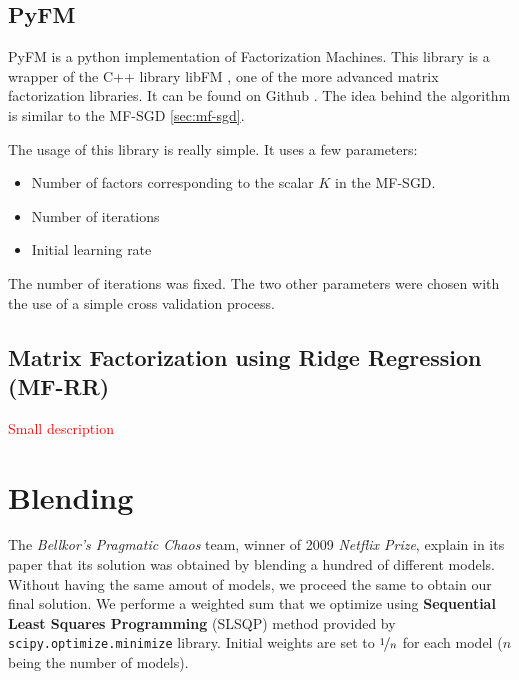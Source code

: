 \documentclass[10pt,conference,compsocconf]{IEEEtran}
\begin{document}
\subsection{PyFM}


PyFM is a python implementation of Factorization Machines. This library is a wrapper of the C++ library libFM \cite{rendle:tist2012}, one of the more advanced matrix factorization libraries. It can be found on Github \cite{pyfm}. The idea behind the algorithm is similar to the MF-SGD \ref{sec:mf-sgd}. 

The usage of this library is really simple. It uses a few parameters:
\begin{itemize}
 \item Number of factors corresponding to the scalar $K$ in the MF-SGD.
 \item Number of iterations
 \item Initial learning rate
\end{itemize}

The number of iterations was fixed. The two other parameters were chosen with the use of a simple cross validation process.

\subsection{Matrix Factorization using Ridge Regression (MF-RR)}

\textcolor{red}{Small description}

\section{Blending}

The \textit{Bellkor's Pragmatic Chaos} team, winner of 2009 \textit{Netflix Prize}, explain in its paper that its solution was obtained by blending a hundred of different models. \cite{BellKore_netflix} Without having the same amout of models, we proceed the same to obtain our final solution. We performe a weighted sum that we optimize using \textbf{Sequential Least Squares Programming} (SLSQP) method provided by \texttt{scipy.optimize.minimize} library. Initial weights are set to $\nicefrac{1}{n}$ for each model ($n$ being the number of models). 
\end{document}
